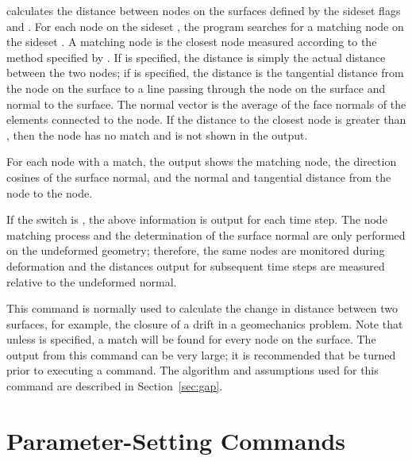  {
 calculates the distance between nodes on the surfaces defined
by the sideset flags  and .  For each
node on the sideset , the program searches for a
matching node on the sideset .  A matching node is the
closest node measured according to the method specified by
.  If  is specified, the
distance is simply the actual distance between the two nodes; if
 is specified, the distance is the tangential distance from
the node on the  surface to a line passing through the
node on the  surface and normal to the surface.  The
normal vector is the average of the face normals of the elements
connected to the node.  If the distance to the closest 
node is greater than , then the  node
has no match and is not shown in the output. 

For each   node with a match, the output shows the
matching   node, the direction cosines of the surface
normal, and the normal and tangential distance from the
 node to the   node.

If the  switch is , the above information is output
for each time step.  The node matching process and the determination of
the surface normal are only performed on the undeformed geometry;
therefore, the same nodes are monitored during deformation and the
distances output for subsequent time steps are measured relative to the
undeformed normal. 

This command is normally used to calculate the change in distance
between two surfaces, for example, the closure of a drift in a
geomechanics problem.  Note that unless  is specified,
a match will be found for every node on the  surface.
The output from this command can be very large; it is recommended that
 be turned  prior to executing a  command.
The algorithm and assumptions used for this command are described in
Section~\ref{sec:gap}.
}

\section{Parameter-Setting Commands}\label{sec:param}

